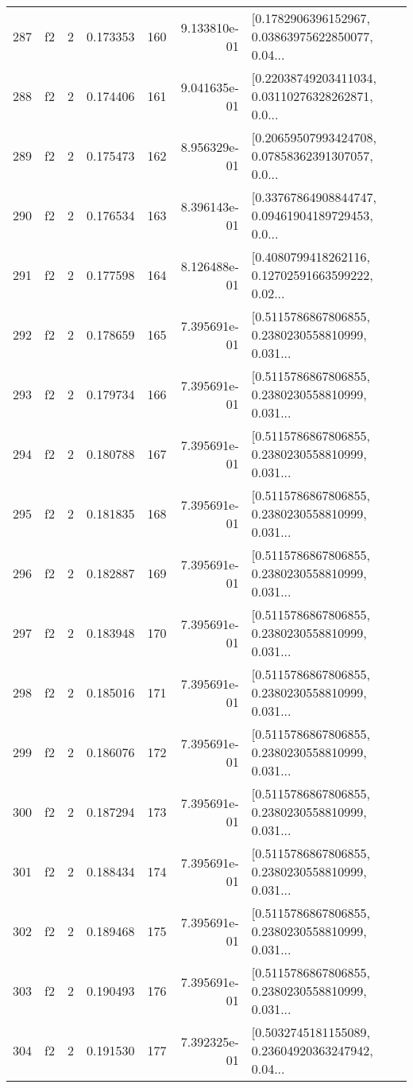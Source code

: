 \begin{tabular}{lllrlrl}
287 &  f2 &   2 &  0.173353 &  160 &  9.133810e-01 &  [0.1782906396152967, 0.03863975622850077, 0.04... \\
288 &  f2 &   2 &  0.174406 &  161 &  9.041635e-01 &  [0.22038749203411034, 0.03110276328262871, 0.0... \\
289 &  f2 &   2 &  0.175473 &  162 &  8.956329e-01 &  [0.20659507993424708, 0.07858362391307057, 0.0... \\
290 &  f2 &   2 &  0.176534 &  163 &  8.396143e-01 &  [0.33767864908844747, 0.09461904189729453, 0.0... \\
291 &  f2 &   2 &  0.177598 &  164 &  8.126488e-01 &  [0.4080799418262116, 0.12702591663599222, 0.02... \\
292 &  f2 &   2 &  0.178659 &  165 &  7.395691e-01 &  [0.5115786867806855, 0.2380230558810999, 0.031... \\
293 &  f2 &   2 &  0.179734 &  166 &  7.395691e-01 &  [0.5115786867806855, 0.2380230558810999, 0.031... \\
294 &  f2 &   2 &  0.180788 &  167 &  7.395691e-01 &  [0.5115786867806855, 0.2380230558810999, 0.031... \\
295 &  f2 &   2 &  0.181835 &  168 &  7.395691e-01 &  [0.5115786867806855, 0.2380230558810999, 0.031... \\
296 &  f2 &   2 &  0.182887 &  169 &  7.395691e-01 &  [0.5115786867806855, 0.2380230558810999, 0.031... \\
297 &  f2 &   2 &  0.183948 &  170 &  7.395691e-01 &  [0.5115786867806855, 0.2380230558810999, 0.031... \\
298 &  f2 &   2 &  0.185016 &  171 &  7.395691e-01 &  [0.5115786867806855, 0.2380230558810999, 0.031... \\
299 &  f2 &   2 &  0.186076 &  172 &  7.395691e-01 &  [0.5115786867806855, 0.2380230558810999, 0.031... \\
300 &  f2 &   2 &  0.187294 &  173 &  7.395691e-01 &  [0.5115786867806855, 0.2380230558810999, 0.031... \\
301 &  f2 &   2 &  0.188434 &  174 &  7.395691e-01 &  [0.5115786867806855, 0.2380230558810999, 0.031... \\
302 &  f2 &   2 &  0.189468 &  175 &  7.395691e-01 &  [0.5115786867806855, 0.2380230558810999, 0.031... \\
303 &  f2 &   2 &  0.190493 &  176 &  7.395691e-01 &  [0.5115786867806855, 0.2380230558810999, 0.031... \\
304 &  f2 &   2 &  0.191530 &  177 &  7.392325e-01 &  [0.5032745181155089, 0.23604920363247942, 0.04... \\

\end{tabular}
